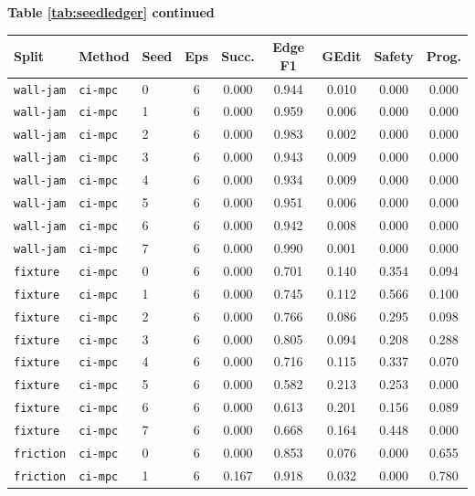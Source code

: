 \documentclass{article}
\begin{document}
\begin{center}
\textbf{Table \ref{tab:seedledger} continued}\\[0.4ex]
\begin{tabular}{lllcccccc}
\toprule
Split & Method & Seed & Eps & Succ. & Edge F1 & GEdit & Safety & Prog. \\
\midrule
\texttt{wall-jam} & \texttt{ci-mpc} & 0 & 6 & 0.000 & 0.944 & 0.010 & 0.000 & 0.000 \\
\texttt{wall-jam} & \texttt{ci-mpc} & 1 & 6 & 0.000 & 0.959 & 0.006 & 0.000 & 0.000 \\
\texttt{wall-jam} & \texttt{ci-mpc} & 2 & 6 & 0.000 & 0.983 & 0.002 & 0.000 & 0.000 \\
\texttt{wall-jam} & \texttt{ci-mpc} & 3 & 6 & 0.000 & 0.943 & 0.009 & 0.000 & 0.000 \\
\texttt{wall-jam} & \texttt{ci-mpc} & 4 & 6 & 0.000 & 0.934 & 0.009 & 0.000 & 0.000 \\
\texttt{wall-jam} & \texttt{ci-mpc} & 5 & 6 & 0.000 & 0.951 & 0.006 & 0.000 & 0.000 \\
\texttt{wall-jam} & \texttt{ci-mpc} & 6 & 6 & 0.000 & 0.942 & 0.008 & 0.000 & 0.000 \\
\texttt{wall-jam} & \texttt{ci-mpc} & 7 & 6 & 0.000 & 0.990 & 0.001 & 0.000 & 0.000 \\
\texttt{fixture} & \texttt{ci-mpc} & 0 & 6 & 0.000 & 0.701 & 0.140 & 0.354 & 0.094 \\
\texttt{fixture} & \texttt{ci-mpc} & 1 & 6 & 0.000 & 0.745 & 0.112 & 0.566 & 0.100 \\
\texttt{fixture} & \texttt{ci-mpc} & 2 & 6 & 0.000 & 0.766 & 0.086 & 0.295 & 0.098 \\
\texttt{fixture} & \texttt{ci-mpc} & 3 & 6 & 0.000 & 0.805 & 0.094 & 0.208 & 0.288 \\
\texttt{fixture} & \texttt{ci-mpc} & 4 & 6 & 0.000 & 0.716 & 0.115 & 0.337 & 0.070 \\
\texttt{fixture} & \texttt{ci-mpc} & 5 & 6 & 0.000 & 0.582 & 0.213 & 0.253 & 0.000 \\
\texttt{fixture} & \texttt{ci-mpc} & 6 & 6 & 0.000 & 0.613 & 0.201 & 0.156 & 0.089 \\
\texttt{fixture} & \texttt{ci-mpc} & 7 & 6 & 0.000 & 0.668 & 0.164 & 0.448 & 0.000 \\
\texttt{friction} & \texttt{ci-mpc} & 0 & 6 & 0.000 & 0.853 & 0.076 & 0.000 & 0.655 \\
\texttt{friction} & \texttt{ci-mpc} & 1 & 6 & 0.167 & 0.918 & 0.032 & 0.000 & 0.780 \\

\end{tabular}
\end{center}
\end{document}
